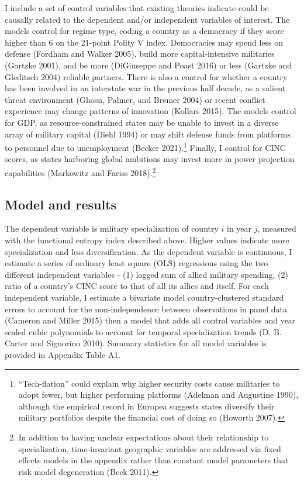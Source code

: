 \documentclass[
  12,
  letterpaper,
  DIV=11,
  numbers=noendperiod]{scrartcl}
\begin{document}
I include a set of control variables that existing theories indicate
could be causally related to the dependent and/or independent variables
of interest. The models control for regime type, coding a country as a
democracy if they score higher than 6 on the 21-point Polity V index.
Democracies may spend less on defense (Fordham and Walker 2005), build
more capital-intensive militaries (Gartzke 2001), and be more
(DiGiuseppe and Poast 2016) or less (Gartzke and Gleditsch 2004)
reliable partners. There is also a control for whether a country has
been involved in an interstate war in the previous half decade, as a
salient threat environment (Ghosn, Palmer, and Bremer 2004) or recent
conflict experience may change patterns of innovation (Kollars 2015).
The models control for GDP, as resource-constrained states may be unable
to invest in a diverse array of military capital (Diehl 1994) or may
shift defense funds from platforms to personnel due to unemployment
(Becker 2021).\footnote{``Tech-flation'' could explain why higher
  security costs cause militaries to adopt fewer, but higher performing
  platforms (Adelman and Augustine 1990), although the empirical record
  in Europea suggests states diversify their military portfolios despite
  the financial cost of doing so (Howorth 2007).} Finally, I control for
CINC scores, as states harboring global ambitions may invest more in
power projection capabilities (Markowitz and Fariss 2018).\footnote{In
  addition to having unclear expectations about their relationship to
  specialization, time-invariant geographic variables are addressed via
  fixed effects models in the appendix rather than constant model
  parameters that risk model degeneration (Beck 2011).}

\hypertarget{model-and-results}{%
\subsection{Model and results}\label{model-and-results}}

The dependent variable is military specialization of country \(i\) in
year \(j\), measured with the functional entropy index described above.
Higher values indicate more specialization and less diversification. As
the dependent variable is continuous, I estimate a series of ordinary
least square (OLS) regressions using the two different independent
variables - (1) logged sum of allied military spending, (2) ratio of a
country's CINC score to that of all its allies and itself. For each
independent variable, I estimate a bivariate model country-clustered
standard errors to account for the non-independence between observations
in panel data (Cameron and Miller 2015) then a model that adds all
control variables and year scaled cubic polynomials to account for
temporal specialization trends (D. B. Carter and Signorino 2010).
Summary statistics for all model variables is provided in Appendix Table
A1.
\end{document}
